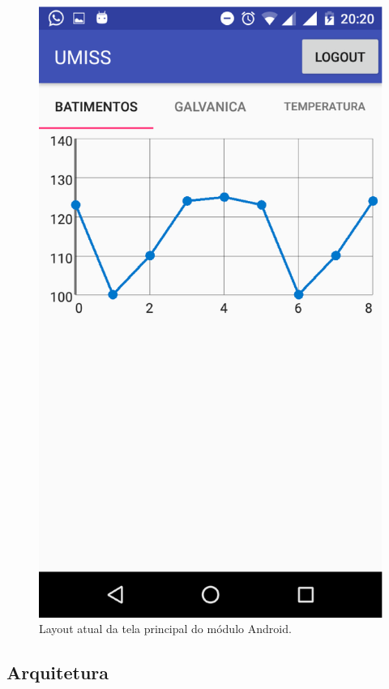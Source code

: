 \begin{itemize}
\begin{figure}[H]
    \begin{center}
        \includegraphics[scale=0.5]{figuras/android.eps}
    \end{center}
    \caption{Layout atual da tela principal do módulo Android.}
\end{figure}

\end{itemize}

\subsection{Arquitetura}

